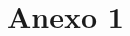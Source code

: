 \documentclass[12pt]{extarticle}
\begin{document}
\begin{spacing}{1.2}
%
%





\end{spacing}

\pagebreak
\section{Anexo 1}
\end{document}
